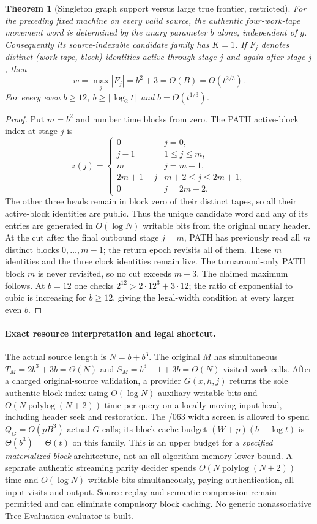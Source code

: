 \documentclass[11pt]{article}
\newtheorem{theorem}{Theorem}
\begin{document}
\begin{theorem}[Singleton graph support versus large true frontier,
restricted]
For the preceding fixed machine on every valid source,
the authentic four-work-tape movement word is determined by the
unary parameter $b$ alone, independent of $y$.
Consequently its source-indexable candidate family has $K=1$.
If $F_j$ denotes distinct (work tape, block) identities active
through stage $j$ and again after stage $j$, then
\[
  \boxed{w=\max_j|F_j|=b^2+3
  =\Theta(B)=\Theta(t^{2/3}).}
\]
For every even $b\ge12$, $b\ge\lceil\log_2 t\rceil$ and
$b=\Theta(t^{1/3})$.
\end{theorem}
\begin{proof}
Put $m=b^2$ and number time blocks from zero. The PATH active-block
index at stage $j$ is
\[
 z(j)=\begin{cases}
  0&j=0,\\
  j-1&1\le j\le m,\\
  m&j=m+1,\\
  2m+1-j&m+2\le j\le 2m+1,\\
  0&j=2m+2.
 \end{cases}
\]
The other three heads remain in block zero of their distinct tapes,
so all their active-block identities are public. Thus the unique
candidate word and any of its entries are generated in
$O(\log N)$ writable bits from the original unary header.
At the cut after the final outbound stage $j=m$, PATH has
previously read all $m$ distinct blocks $0,\ldots,m-1$;
the return epoch revisits all of them. These $m$ identities
and the three clock identities remain live. The turnaround-only
PATH block $m$ is never revisited, so no cut exceeds $m+3$.
The claimed maximum follows. At $b=12$ one checks
$2^{12}>2\cdot12^3+3\cdot12$; the ratio of exponential
to cubic is increasing for $b\ge12$, giving the legal-width
condition at every larger even $b$.
\end{proof}

\paragraph{Exact resource interpretation and legal shortcut.}
The actual source length is $N=b+b^3$.
The original $M$ has simultaneous
$T_M=2b^3+3b=\Theta(N)$ and
$S_M=b^3+1+3b=\Theta(N)$ visited work cells.
After a charged original-source validation, a provider
$G(x,h,j)$ returns the sole authentic block index using
$O(\log N)$ auxiliary writable bits and
$O(N\operatorname{polylog}(N+2))$ time per query on a
locally moving input head, including header seek and restoration.
The /063 width screen is allowed to spend
$Q_G=O(pB^3)$ actual $G$ calls; its block-cache
budget $(W+p)(b+\log t)$ is
$\Theta(b^3)=\Theta(t)$ on this family.
This is an upper budget for a \emph{specified materialized-block}
architecture, not an all-algorithm memory lower bound.
A separate authentic streaming parity decider spends
$O(N\operatorname{polylog}(N+2))$ time and $O(\log N)$
writable bits simultaneously, paying authentication, all
input visits and output. Source replay and semantic compression
remain permitted and can eliminate compulsory block caching.
No generic nonassociative Tree Evaluation evaluator is built.
\end{document}
